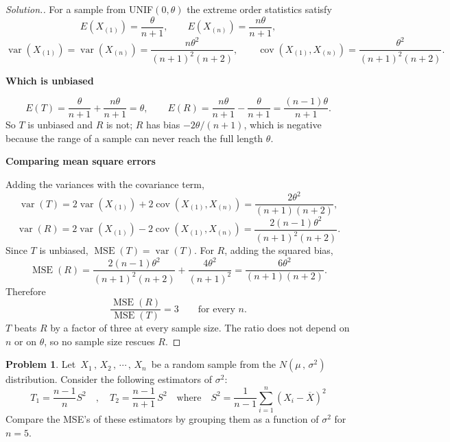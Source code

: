 \documentclass[12pt,a4paper]{report}
\theoremstyle{definition}
\newcommand{\subhead}[1]{%
  \par\medskip\noindent\textbf{#1}\par\nobreak\smallskip}
\DeclareMathOperator{\var}{var}
\DeclareMathOperator{\cov}{cov}
\DeclareMathOperator{\MSE}{MSE}
\newtheorem{problemx}{Problem}[section]
\newenvironment{problem}{\begin{problemx}}{\end{problemx}}
\newenvironment{solution}
  {\renewcommand{\qedsymbol}{}\begin{proof}[\textit{Solution}.]}
  {\end{proof}}
\begin{document}
\begin{solution}
For a sample from UNIF$(0,\theta)$ the extreme order statistics satisfy
\[E\left(X_{(1)}\right) = \frac{\theta}{n+1},\qquad
E\left(X_{(n)}\right) = \frac{n\theta}{n+1},\]
\[\var\left(X_{(1)}\right) = \var\left(X_{(n)}\right) = \frac{n\theta^{2}}{(n+1)^{2}(n+2)},
\qquad
\cov\left(X_{(1)},X_{(n)}\right) = \frac{\theta^{2}}{(n+1)^{2}(n+2)} .\]

\subhead{Which is unbiased}
\[E(T) = \frac{\theta}{n+1} + \frac{n\theta}{n+1} = \theta ,\qquad
E(R) = \frac{n\theta}{n+1} - \frac{\theta}{n+1} = \frac{(n-1)\theta}{n+1}.\]
So $T$ is unbiased and $R$ is not; $R$ has bias $-2\theta/(n+1)$, which is
negative because the range of a sample can never reach the full length $\theta$.

\subhead{Comparing mean square errors}
Adding the variances with the covariance term,
\[\var(T) = 2\var\left(X_{(1)}\right) + 2\cov\left(X_{(1)},X_{(n)}\right)
= \frac{2\theta^{2}}{(n+1)(n+2)},\]
\[\var(R) = 2\var\left(X_{(1)}\right) - 2\cov\left(X_{(1)},X_{(n)}\right)
= \frac{2(n-1)\theta^{2}}{(n+1)^{2}(n+2)} .\]
Since $T$ is unbiased, $\MSE (T) = \var(T)$. For $R$, adding the squared bias,
\[\MSE (R) = \frac{2(n-1)\theta^{2}}{(n+1)^{2}(n+2)} + \frac{4\theta^{2}}{(n+1)^{2}}
= \frac{6\theta^{2}}{(n+1)(n+2)} .\]
Therefore
\[\frac{\MSE (R)}{\MSE (T)} = 3 \qquad\text{for every } n .\]
$T$ beats $R$ by a factor of three at every sample size. The ratio does not
depend on $n$ or on $\theta$, so no sample size rescues $R$.
\end{solution}

\begin{problem}
Let $\, X_1\, , \, X_2\, , \, \cdots \, , \, X_n\,$ be a random sample from the $N(\mu\, , \, \sigma^2)$ distribution. Consider the following estimators of $\sigma^2$:
\[T_1= \frac{n - 1}{n}S^2\quad , \quad  T_2 = \frac{n - 1}{n + 1}\, S^2\quad \text{where}\quad S^2 = \frac{1}{n - 1}\sum^n_{i = 1}\left(X_i - \overline{X}\right)^2\]
Compare the MSE's of these estimators by grouping them as a function of $\sigma^2$ for $n = 5$.
\end{problem}
\end{document}
